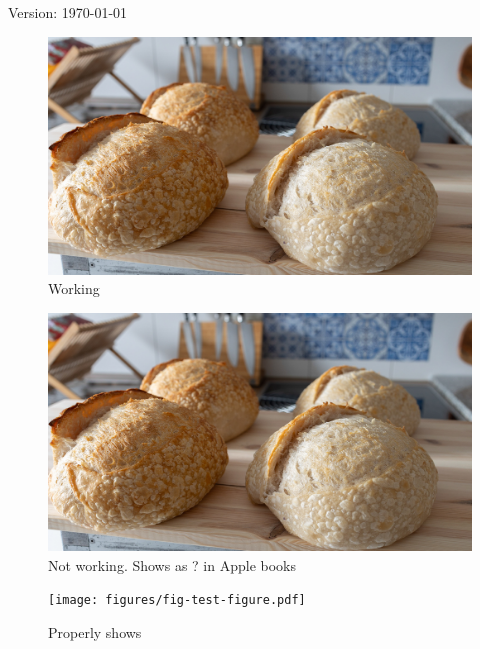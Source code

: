 \documentclass[a4paper, 12pt]{book}
\begin{document}
\begin{titlepage}
	\centering
  Version:
  \today
\end{titlepage}

\begin{figure}
  \includegraphics[width=\textwidth]{bread.jpg}
  \caption{Working}
\end{figure}

\begin{figure}
  \includegraphics[width=\textwidth]{bread-2.jpg}
  \caption{Not working. Shows as ? in Apple books}
\end{figure}

\begin{figure}
  \texttt{[image: figures/fig-test-figure.pdf]}
  \caption{Properly shows}
\end{figure}
\end{document}
